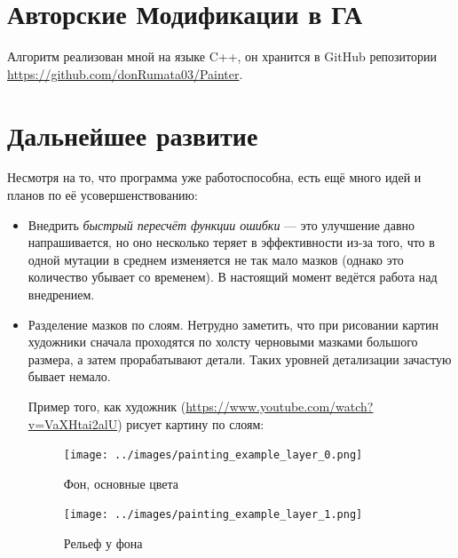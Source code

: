 \documentclass[11pt]{article}
\begin{document}
    \section{Авторские Модификации  в ГА}

    Алгоритм реализован мной на языке C++, он хранится в GitHub репозитории \href{https://github.com/donRumata03/Painter}{https://github.com/donRumata03/Painter}.

    \section{Дальнейшее развитие}
    Несмотря на то, что программа уже работоспособна, есть ещё много идей и планов по её усовершенствованию:
    \begin{itemize}
        \item Внедрить \textit{быстрый пересчёт функции ошибки} — это улучшение давно напрашивается,
                но оно несколько теряет в эффективности из-за того, что в одной мутации в среднем изменяется не так мало мазков (однако это количество убывает со временем).
                В настоящий момент ведётся работа над внедрением.
        \item Разделение мазков по слоям.
                Нетрудно заметить, что при рисовании картин художники сначала проходятся по холсту черновыми мазками большого размера, а затем \— прорабатывают детали.
                Таких уровней детализации зачастую бывает немало.

        Пример того, как художник (\href{https://www.youtube.com/watch?v=VaXHtai2alU}{https://www.youtube.com/watch?v=VaXHtai2alU}) рисует картину по слоям:
        \begin{figure}[!htb]
            \centering

                \texttt{[image: ../images/painting\_example\_layer\_0.png]}
                \caption{Фон, основные цвета}\label{fig:layer0}
            \endminipage\hfill

                \texttt{[image: ../images/painting\_example\_layer\_1.png]}
                \caption{Рельеф у фона}\label{fig:layer1}
            \endminipage\hfill


\end{figure}
\end{itemize}
\end{document}
